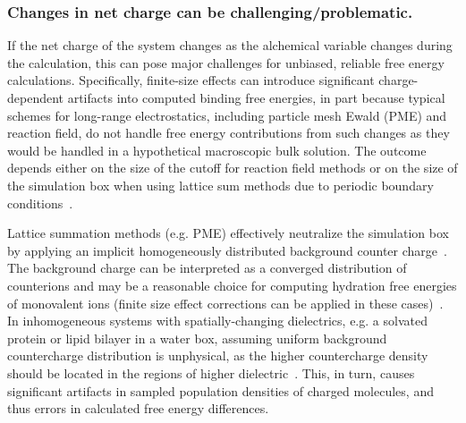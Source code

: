 \documentclass[9pt,bestpractices]{livecoms}
\begin{document}
\subsubsection{Changes in net charge can be challenging/problematic.}
\label{subsec:net charge}
If the net charge of the system changes as the alchemical variable changes during the calculation, this can pose major challenges for unbiased, reliable free energy calculations.
Specifically, finite-size effects can introduce significant charge-dependent artifacts into computed binding free energies, in part because typical schemes for long-range electrostatics, including particle mesh Ewald (PME) and reaction field, do not handle free energy contributions from such changes as they would be handled in a hypothetical macroscopic bulk solution. The outcome depends either on the size of the cutoff for reaction field methods or on the size of the simulation box when using lattice sum methods due to periodic boundary conditions~\cite{lin2014overview, ohlknecht2020correcting, rocklin2013calculating}.

Lattice summation methods (e.g. PME) effectively neutralize the simulation box by applying an implicit homogeneously distributed background counter charge~\cite{figueirido1995finite,hummer1996free}. The background charge can be interpreted as a converged distribution of counterions and may be a reasonable choice for computing hydration free energies of monovalent ions (finite size effect corrections can be applied in these cases)~\cite{hummer1996free}. In inhomogeneous systems with spatially-changing dielectrics, e.g. a solvated protein or lipid bilayer in a water box, assuming uniform background countercharge distribution is unphysical, as the higher countercharge density should be located in the regions of higher dielectric~\cite{hub2014pme}. This, in turn, causes significant artifacts in sampled population densities of charged molecules, and thus errors in calculated free energy differences.
\end{document}
